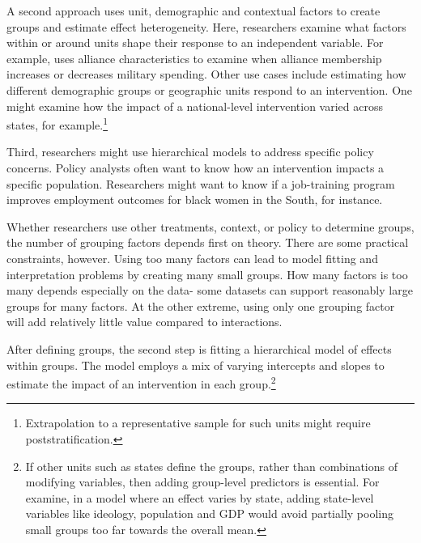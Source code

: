 \documentclass[12pt]{article}
\begin{document}
A second approach uses unit, demographic and contextual factors to create groups and estimate  effect heterogeneity. 
Here, researchers examine what factors within or around units shape their response to an independent variable.
For example, \citet{Alley2021isq} uses alliance characteristics to examine when alliance membership increases or decreases military spending.
Other use cases include estimating how different demographic groups or geographic units respond to an intervention.
One might examine how the impact of a national-level intervention varied across states, for example.\footnote{Extrapolation to a representative sample for such units might require poststratification.}


Third, researchers might use hierarchical models to address specific policy concerns.
Policy analysts often want to know how an intervention impacts a specific population. 
Researchers might want to know if a job-training program improves employment outcomes for black women in the South, for instance.  


Whether researchers use other treatments, context, or policy to determine groups, the number of grouping factors depends first on theory.
There are some practical constraints, however.
Using too many factors can lead to model fitting and interpretation problems by creating many small groups.
How many factors is too many depends especially on the data- some datasets can support reasonably large groups for many factors. 
At the other extreme, using only one grouping factor will add relatively little value compared to interactions. 



After defining groups, the second step is fitting a hierarchical model of effects within groups.
The model employs a mix of varying intercepts and slopes to estimate the impact of an intervention in each group.\footnote{If other units such as states define the groups, rather than combinations of modifying variables, then adding group-level predictors is essential. For examine, in a model where an effect varies by state, adding state-level variables like ideology, population and GDP would avoid partially pooling small groups too far towards the overall mean.}
\end{document}
